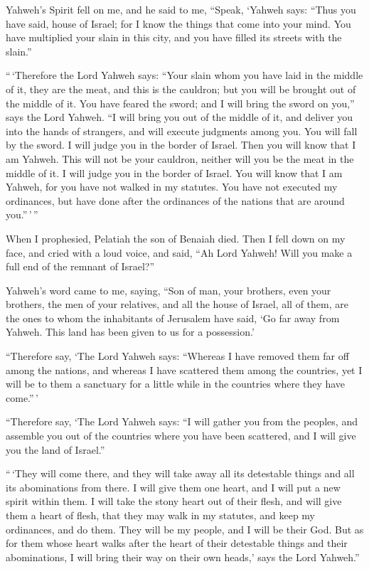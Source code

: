  Yahweh's Spirit fell on me, and he said to me, ``Speak,
`Yahweh says: ``Thus you have said, house of Israel; for I know the
things that come into your mind.  You have multiplied your
slain in this city, and you have filled its streets with the slain.''

 ``\,`Therefore the Lord Yahweh says: ``Your slain whom you
have laid in the middle of it, they are the meat, and this is the
cauldron; but you will be brought out of the middle of it. 
You have feared the sword; and I will bring the sword on you,'' says the
Lord Yahweh.  ``I will bring you out of the middle of it,
and deliver you into the hands of strangers, and will execute judgments
among you.  You will fall by the sword. I will judge you in
the border of Israel. Then you will know that I am Yahweh. 
This will not be your cauldron, neither will you be the meat in the
middle of it. I will judge you in the border of Israel. 
You will know that I am Yahweh, for you have not walked in my statutes.
You have not executed my ordinances, but have done after the ordinances
of the nations that are around you.''\,'\,''

 When I prophesied, Pelatiah the son of Benaiah died. Then
I fell down on my face, and cried with a loud voice, and said, ``Ah Lord
Yahweh! Will you make a full end of the remnant of Israel?''

 Yahweh's word came to me, saying,  ``Son of
man, your brothers, even your brothers, the men of your relatives, and
all the house of Israel, all of them, are the ones to whom the
inhabitants of Jerusalem have said, `Go far away from Yahweh. This land
has been given to us for a possession.'

 ``Therefore say, `The Lord Yahweh says: ``Whereas I have
removed them far off among the nations, and whereas I have scattered
them among the countries, yet I will be to them a sanctuary for a little
while in the countries where they have come.''\,'

 ``Therefore say, `The Lord Yahweh says: ``I will gather
you from the peoples, and assemble you out of the countries where you
have been scattered, and I will give you the land of Israel.''

 ``\,`They will come there, and they will take away all its
detestable things and all its abominations from there.  I
will give them one heart, and I will put a new spirit within them. I
will take the stony heart out of their flesh, and will give them a heart
of flesh,  that they may walk in my statutes, and keep my
ordinances, and do them. They will be my people, and I will be their
God.  But as for them whose heart walks after the heart of
their detestable things and their abominations, I will bring their way
on their own heads,' says the Lord Yahweh.''

